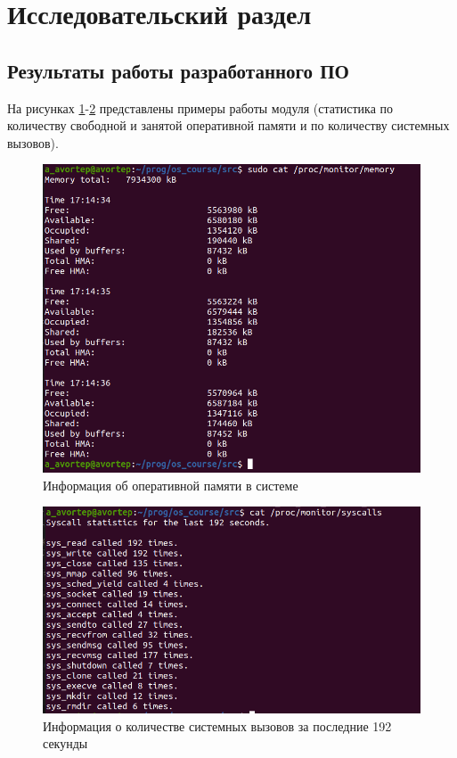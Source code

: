 \section{Исследовательский раздел}

\subsection{Результаты работы разработанного ПО}

На рисунках \ref{fig:example_mem}-\ref{fig:example_syscalls} представлены примеры работы модуля (статистика по количеству свободной и занятой оперативной памяти и по количеству системных вызовов).

\begin{figure}[h!]
	\begin{center}
		\includegraphics[scale=0.35]{jpg/mem_res.png}
	\end{center}
	\captionsetup{justification=centering}
	\caption{Информация об оперативной памяти в системе}
	\label{fig:example_mem}
\end{figure}

\begin{figure}[h!]
	\begin{center}
		\includegraphics[scale=0.4]{jpg/cat_syscalls.png}
	\end{center}
	\captionsetup{justification=centering}
	\caption{Информация о количестве системных вызовов за последние 192 секунды}
	\label{fig:example_syscalls}
\end{figure}

